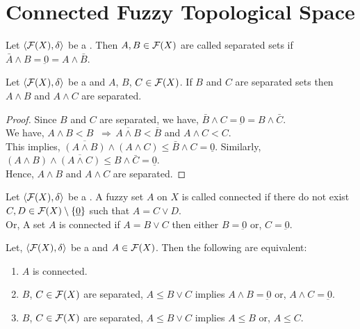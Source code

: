 \documentclass[../main-sheet.tex]{subfiles}
\begin{document}
\chapter{Connected Fuzzy Topological Space}
\begin{defn}
    Let \(\langle \mathcal{F}(X), \delta \rangle\) be a \fts. Then \(A,B\in \mathcal{F}(X)\) are called separated sets if \(\bar{A}\wedge B=\underbar{0}=A\wedge\bar{B}\).
\end{defn}
\begin{lem}
    Let \(\langle \mathcal{F}(X), \delta \rangle\) be a \fts and \(A\), \(B\), \(C\in \mathcal{F}(X)\). If \(B\) and \(C\) are separated sets then \(A\wedge B\) and \(A\wedge C\) are separated.
\end{lem}
\begin{proof}
    Since \(B\) and \(C\) are separated, we have, \(\bar{B}\wedge C=\underbar{0}=B\wedge\bar{C}\).\\
    We have, \(A\wedge B < B\;\;\Rightarrow\, \overline{A\wedge B}< \overline{B}\) and \(A\wedge C <C\).\\
    This implies, \(\overline{(A\wedge B)}\wedge (A\wedge C)\leq \bar{B}\wedge C=\underline{0}\). Similarly, \((A\wedge B)\wedge \overline{(A\wedge C)}\leq B\wedge \bar{C}=\underline{0}\).\\
    Hence, \(A\wedge B\) and \(A\wedge C\) are separated.
\end{proof}
\begin{defn}
    Let \(\langle \mathcal{F}(X), \delta \rangle\) be a \fts. A fuzzy set \(A\) on \(X\) is called connected if there do not exist \(C,D\in \mathcal{F}(X)\setminus\left\{\underbar{0}\right\}\) such that \(A=C\vee D\).\\
    Or, A set \(A\) is connected if \(A=B\vee C\) then either \(B=\underbar{0}\) or, \(C=\underbar{0}\).
\end{defn}
\begin{thm}
    Let, \(\langle \mathcal{F}(X), \delta \rangle\) be a \fts\space and \(A\in\mathcal{F}(X)\). Then the following are equivalent:
    \begin{enumerate}
        \item \(A\) is connected.
        \item \(B\), \(C\in\mathcal{F}(X)\) are separated, \(A\leq B\vee C\) implies \(A\wedge B=\underbar{0}\) or, \(A\wedge C=\underbar{0}\).
        \item \(B\), \(C\in\mathcal{F}(X)\) are separated, \(A\leq B\vee C\) implies \(A\leq B\) or, \(A\leq C\).
    \end{enumerate}
\end{thm}
\end{document}
